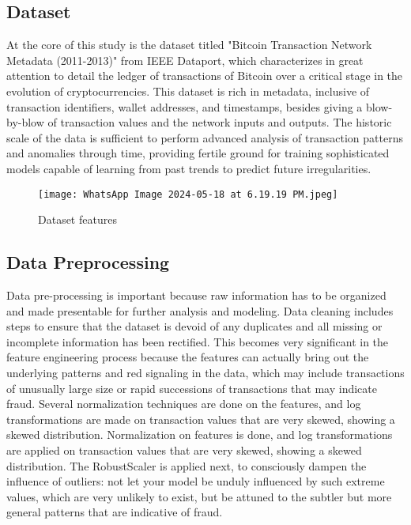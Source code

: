 \documentclass[journal]{IEEEtran}
\begin{document}
\subsection{Dataset}
At the core of this study is the dataset titled "Bitcoin Transaction Network Metadata (2011-2013)" from IEEE Dataport, which characterizes in great attention to detail the ledger of transactions of Bitcoin over a critical stage in the evolution of cryptocurrencies. This dataset is rich in metadata, inclusive of transaction identifiers, wallet addresses, and timestamps, besides giving a blow-by-blow of transaction values and the network inputs and outputs. The historic scale of the data is sufficient to perform advanced analysis of transaction patterns and anomalies through time, providing fertile ground for training sophisticated models capable of learning from past trends to predict future irregularities.

\begin{figure}[h!]
    \centering
    \texttt{[image: WhatsApp Image 2024-05-18 at 6.19.19 PM.jpeg]}
    \caption{Dataset features}
    \label{fig:enter-label}
\end{figure}

\subsection{Data Preprocessing}
Data pre-processing is important because raw information has to be organized and made presentable for further analysis and modeling. Data cleaning includes steps to ensure that the dataset is devoid of any duplicates and all missing or incomplete information has been rectified. This becomes very significant in the feature engineering process because the features can actually bring out the underlying patterns and red signaling in the data, which may include transactions of unusually large size or rapid successions of transactions that may indicate fraud. Several normalization techniques are done on the features, and log transformations are made on transaction values that are very skewed, showing a skewed distribution. Normalization on features is done, and log transformations are applied on transaction values that are very skewed, showing a skewed distribution. The RobustScaler is applied next, to consciously dampen the influence of outliers: not let your model be unduly influenced by such extreme values, which are very unlikely to exist, but be attuned to the subtler but more general patterns that are indicative of fraud.
\end{document}
